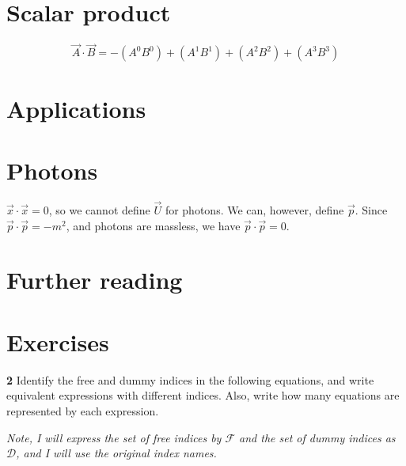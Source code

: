 \documentclass[gr-notes.tex]{subfiles}
\begin{document}
\section{Scalar product}

\begin{displaymath}
  \vec{A} \cdot \vec{B} =
  -(A^0 B^0) + (A^1 B^1) + (A^2 B^2) + (A^3 B^3)
\end{displaymath}

\section{Applications}

\section{Photons}

$\vec{x} \cdot \vec{x} = 0$, so we cannot define $\vec{U}$ for photons. We can, however, define $\vec{p}$. Since $\vec{p} \cdot \vec{p} = -m^2$, and photons are massless, we have $\vec{p} \cdot \vec{p} = 0$.

\section{Further reading}

\section{Exercises}

\textbf{2}
Identify the free and dummy indices in the following equations, and write equivalent expressions with different indices. Also, write how many equations are represented by each expression.

\emph{Note, I will express the set of free indices by $\mathcal{F}$ and the set of dummy indices as $\mathcal{D}$, and I will use the original index names.}
\end{document}
